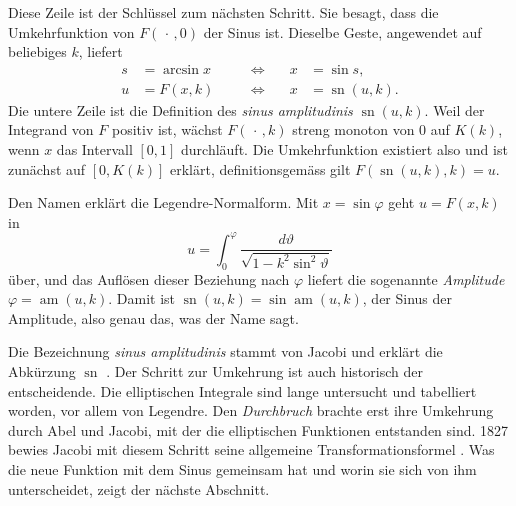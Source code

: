 Diese Zeile ist der Schlüssel zum nächsten Schritt.
Sie besagt, dass die Umkehrfunktion von $F(\,\cdot\,, 0)$ der
Sinus ist.
Dieselbe Geste, angewendet auf beliebiges $k$, liefert
\begin{equation}
\begin{aligned}
s
&=
\arcsin x
&\quad&\Leftrightarrow\quad&
x
&=
\sin s,
\\
u
&=
F(x,k)
&\quad&\Leftrightarrow\quad&
x
&=
\operatorname{sn}(u,k).
\end{aligned}
\label{elliptisch:equation:umkehrung}
\end{equation}
Die untere Zeile ist die Definition des
\emph{sinus amplitudinis} $\operatorname{sn}(u,k)$.
Weil der Integrand von $F$ positiv ist, wächst
$F(\,\cdot\,, k)$ streng monoton von $0$ auf $K(k)$, wenn $x$ das
Intervall $[0,1]$ durchläuft.
Die Umkehrfunktion existiert also und ist zunächst auf
$[0, K(k)]$ erklärt, definitionsgemäss gilt
$F(\operatorname{sn}(u,k), k) = u$.
%

Den Namen erklärt die Legendre-Normalform.
Mit $x = \sin\varphi$ geht $u = F(x,k)$ in
\begin{equation}
u
=
\int_0^\varphi \frac{d\vartheta}{\sqrt{1-k^2\sin^2\vartheta}}
\label{elliptisch:equation:amplitude}
\end{equation}
über, und das Auflösen dieser Beziehung nach $\varphi$ liefert die
sogenannte \emph{Amplitude} $\varphi = \operatorname{am}(u,k)$.
Damit ist $\operatorname{sn}(u,k) = \sin\operatorname{am}(u,k)$,
der Sinus der Amplitude, also genau das, was der Name sagt.
%

Die Bezeichnung \emph{sinus amplitudinis} stammt von Jacobi und
erklärt die Abkürzung $\operatorname{sn}$
\cite[Abschnitt~11.2]{elliptisch:mueller-spezielle}.
Der Schritt zur Umkehrung ist auch historisch der entscheidende.
Die elliptischen Integrale sind lange untersucht und tabelliert
worden, vor allem von Legendre.
Den \emph{Durchbruch} brachte erst ihre Umkehrung durch Abel und Jacobi,
mit der die elliptischen Funktionen entstanden sind.
1827 bewies Jacobi mit diesem Schritt seine allgemeine
Transformationsformel
\cite{elliptisch:wiki-elliptische-funktion}.
Was die neue Funktion mit dem Sinus gemeinsam hat und worin sie
sich von ihm unterscheidet, zeigt der nächste Abschnitt.

